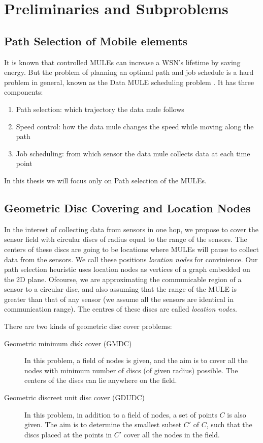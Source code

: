 \chapter{Preliminaries and Subproblems}
\label{chap:location_nodes}

\section{Path Selection of Mobile elements}

It is known that controlled MULEs can increase a WSN's lifetime by saving energy. But the problem of planning an optimal path and job schedule is a hard problem in general, known as the Data MULE scheduling problem \cite{dms}. It has three components:
\begin{enumerate}
\item Path selection: which trajectory the data mule follows
\item Speed control: how the data mule changes the speed while moving along the path
\item Job scheduling: from which sensor the data mule collects data at each time point
\end{enumerate}
In this thesis we will focus only on Path selection of the MULEs.

\section{Geometric Disc Covering and Location Nodes}

In the interest of collecting data from sensors in one hop, we propose to cover the sensor field with circular discs of radius equal to the range of the sensors. The centers of these discs are going to be locations where MULEs will pause to collect data from the sensors. We call these positions \emph{location nodes} for convinience. Our path selection heuristic uses location nodes as vertices of a graph embedded on the 2D plane. Ofcourse, we are approximating the communicable region of a sensor to a circular disc, and also assuming that the range of the MULE is greater than that of any sensor (we assume all the sensors are identical in communication range). The centres of these discs are called \emph{location nodes}.

There are two kinds of geometric disc cover problems:

\begin{description}
\item[Geometric minimum disk cover (GMDC)] In this problem, a field of nodes is given, and the aim is to cover all the nodes with minimum number of discs (of given radius) possible. The centers of the discs can lie anywhere on the field.
\item[Geometric discreet unit disc cover (GDUDC)] In this problem, in addition to a field of nodes, a set of points $C$ is also given. The aim is to determine the smallest subset $C'$ of $C$, such that the discs placed at the points in $C'$ cover all the nodes in the field.
\end{description}

